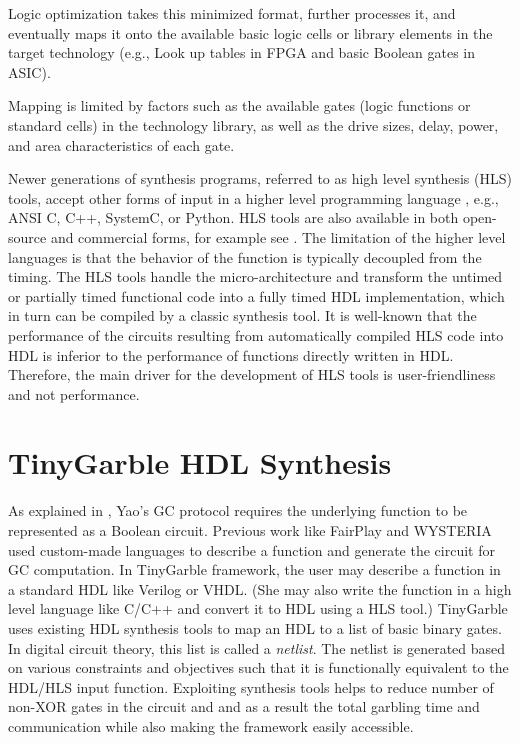 Logic optimization takes this minimized format, further processes it, and eventually maps it onto the available basic logic cells or library elements in the target technology (e.g., Look up tables in FPGA and basic Boolean gates in ASIC).

Mapping is limited by factors such as the available gates (logic functions or standard cells) in the technology library, as well as the drive sizes, delay, power, and area characteristics of each gate.

Newer generations of synthesis programs, referred to as high level synthesis (HLS) tools, accept other forms of input in a higher level programming language \cite{Chapter:Zhang2008,chu1989hyper,corazao1996performance}, e.g., ANSI C, C++, SystemC, or Python.
HLS tools are also available in both open-source and commercial forms, for example see \cite{tool:Vivado,decaluwe2004myhdl,tool:PandA}.
The limitation of the higher level languages is that the behavior of the function is typically decoupled from the timing.
The HLS tools handle the micro-architecture and transform the untimed or partially timed functional code into a fully timed HDL implementation, which in turn can be compiled by a classic synthesis tool.
It is well-known that the performance of the circuits resulting from automatically compiled HLS code into HDL is inferior to the performance of functions directly written in HDL.
Therefore, the main driver for the development of HLS tools is user-friendliness and not performance.

\section{TinyGarble HDL Synthesis}\label{sec:syn-tiny}
As explained in , Yao's GC protocol requires the underlying function to be represented as a Boolean circuit.
Previous work like FairPlay \cite{malkhi2004fairplay} and WYSTERIA \cite{rastogi2014wysteria} used custom-made languages to describe a function and generate the circuit for GC computation.
In TinyGarble framework, the user may describe a function in a standard HDL like Verilog or VHDL.
(She may also write the function in a high level language like C/C++ and convert it to HDL using a HLS tool.)
TinyGarble uses existing HDL synthesis tools to map an HDL to a list of basic binary gates.
In digital circuit theory, this list is called a \emph{netlist}.
The netlist is generated based on various constraints and objectives such that it is functionally equivalent to the HDL/HLS input function.
Exploiting synthesis tools helps to reduce number of non-XOR gates in the circuit and and as a result the total garbling time and communication while also making the framework easily accessible.

